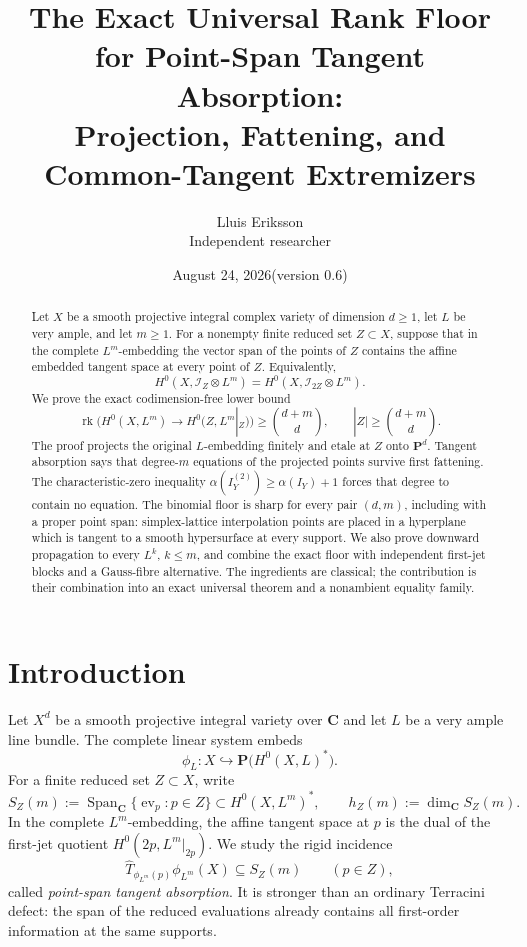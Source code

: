 \documentclass[11pt]{article}
\title{The Exact Universal Rank Floor for Point-Span Tangent Absorption:\\
Projection, Fattening, and Common-Tangent Extremizers}
\author{Lluis Eriksson\\\small Independent researcher}
\date{August 24, 2026\quad (version 0.6)}
\newcommand{\PP}{\mathbf P}
\newcommand{\CC}{\mathbf C}
\newcommand{\cI}{\mathcal I}
\newcommand{\Span}{\operatorname{Span}}
\newcommand{\rk}{\operatorname{rk}}
\begin{document}
\maketitle

\begin{abstract}
Let $X$ be a smooth projective integral complex variety of dimension $d\geq1$,
let $L$ be very ample, and let $m\geq1$.  For a nonempty finite reduced set
$Z\subset X$, suppose that in the complete $L^m$-embedding the vector span of
the points of $Z$ contains the affine embedded tangent space at every point of
$Z$.  Equivalently,
\[
 H^0(X,\cI_Z\otimes L^m)=H^0(X,\cI_{2Z}\otimes L^m).
\]
We prove the exact codimension-free lower bound
\[
 \rk\bigl(H^0(X,L^m)\to H^0(Z,L^m|_Z)\bigr)
 \geq\binom{d+m}{d},\qquad |Z|\geq\binom{d+m}{d}.
\]
The proof projects the original $L$-embedding finitely and etale at $Z$ onto
$\PP^d$.  Tangent absorption says that degree-$m$ equations of the projected
points survive first fattening.  The characteristic-zero inequality
$\alpha(I_Y^{(2)})\geq\alpha(I_Y)+1$ forces that degree to contain no equation.
The binomial floor is sharp for every pair $(d,m)$, including with a proper
point span: simplex-lattice interpolation points are placed in a hyperplane
which is tangent to a smooth hypersurface at every support.  We also prove
downward propagation to every $L^k$, $k\leq m$, and combine the exact floor
with independent first-jet blocks and a Gauss-fibre alternative.  The
ingredients are classical; the contribution is their combination into an
exact universal theorem and a nonambient equality family.
\end{abstract}

\section{Introduction}

Let $X^d$ be a smooth projective integral variety over $\CC$ and let $L$ be a
very ample line bundle.  The complete linear system embeds
\[
 \phi_L:X\hookrightarrow\PP\bigl(H^0(X,L)^*\bigr).
\]
For a finite reduced set $Z\subset X$, write
\[
 S_Z(m):=\Span_{\CC}\{\operatorname{ev}_p:p\in Z\}
          \subset H^0(X,L^m)^*,
 \qquad h_Z(m):=\dim_{\CC}S_Z(m).
\]
In the complete $L^m$-embedding, the affine tangent space at $p$ is the dual
of the first-jet quotient $H^0(2p,L^m|_{2p})$.  We study the rigid incidence
\begin{equation}\label{eq:absorption-intro}
 \widehat T_{\phi_{L^m}(p)}\phi_{L^m}(X)\subseteq S_Z(m)
 \qquad(p\in Z),
\end{equation}
called \emph{point-span tangent absorption}.  It is stronger than an ordinary
Terracini defect: the span of the reduced evaluations already contains all
first-order information at the same supports.
\end{document}
